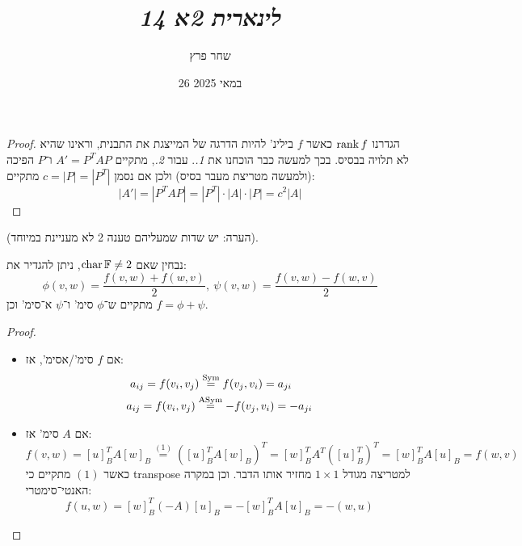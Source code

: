 \documentclass[]{../../../../tex/classes/styledArticle}
\author{שחר פרץ}
\title{\textit{לינארית 2א 14}}
\date{26 במאי 2025}
\begin{document}
    \maketitle
    
    \begin{proof}
        הגדרנו $\operatorname{rank} f$ כאשר $f$ בילינ' להיות הדרגה של המייצגת את התבנית, וראינו שהיא לא תלויה בבסיס. בכך למעשה כבר הוכחנו את \textit{1.}. עבור \textit{2.}, מתקיים $A' = P^TAP$ ו־$P$ הפיכה (ולמעשה מטריצת מעבר בסיס) ולכן אם נסמן $c = |P| = |P^T|$ מתקיים: 
        \[ |A'| = |P^TAP| = |P^T| \cdot |A| \cdot |P| = c^2 |A| \]
    \end{proof}
    (הערה: יש שדות שמעליהם טענה 2 לא מעניינת במיוחד). 
    
    נבחין שאם $\operatorname{char} \mathbb{F} \neq 2$, ניתן להגדיר את: 
    \[ \phi(v, w) = \frac{f(v, w) + f(w, v)}{2}, \ \psi(v, w) = \frac{f(v, w) - f(w, v)}{2} \]
    מתקיים ש־$\phi$ סימ' ו־$\psi$ א־סימ' וכן $f = \phi + \psi$. 
    
    
    \begin{proof}
        \begin{itemize}
            \item[$\implies$] אם $f$ סימ'/אסימ', אז: 
            \begin{align*}
                a_{ij} = f(v_i, v_j) &\overset{\operatorname{Sym}}{=} f(v_j, v_i) = a_{ji} \\
                a_{ij} = f(v_i, v_j) \,\,&\!\!\overset{\operatorname{ASym}}{=} -f(v_j, v_i) = -a_{ji}
            \end{align*}
            \item[$\impliedby$] אם $A$ סימ' אז: 
            \[ f(v, w) = [u]_B^TA[w]_B \overset{(1)}{=} ([u]_B^TA[w]_B)^T = [w]_B^TA^T([u]_B^T)^T = [w]^T_BA[u]_B = f(w, v) \]
            כאשר $(1)$ מתקיים כי transpose למטריצה מגודל $1 \times 1$ מחזיר אותו הדבר. וכן במקרה האנטי־סימטרי: 
            \[ f(u, w) = [w]^T_B(-A)[u]_B = -[w]_B^TA[u]_B = -(w, u) \]
        \end{itemize}
    \end{proof}
    
\end{document}
